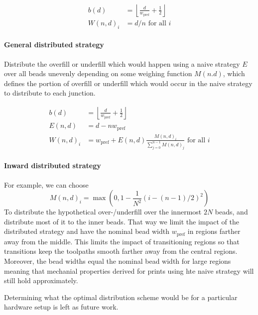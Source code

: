 \begin{align*}
b(d) &= \left\lfloor \frac{d}{ w_\text{pref}} + \frac12 \right\rfloor \\
W(n,d)_i &= d / n \text{ for all } i 
\end{align*}


\paragraph{General distributed strategy}
Distribute the overfill or underfill which would happen using a naive strategy $E$ over all beads unevenly depending on some weighing function $M(n.d)$, which defines the portion of overfill or underfill which would occur in the naive strategy to distribute to each junction.


\begin{align*}
b(d) &= \left\lfloor \frac{d}{ w_\text{pref}} + \frac12 \right\rfloor \\
E(n,d) &= d - n w_\text{pref} \\
W(n,d)_i &= w_\text{pref} + E(n,d) \frac{M(n,d)_i}{\sum_{j=0}^{n-1} M(n,d)_j} \text{ for all } i 
\end{align*}



\paragraph{Inward distributed strategy}
For example, we can choose 
$$M(n,d)_i = \max(0, 1 - \frac{1}{N^2} (i - (n-1)/2)^2 )$$
To distribute the hypothetical over-/underfill over the innermost $2N$ beads, and distribute most of it to the inner beads.
That way we limit the impact of the distributed strategy and have the nominal bead width $w_\text{pref}$ in regions farther away from the middle.
This limits the impact of transitioning regions so that transitions keep the toolpaths smooth farther away from the central regions.
Moreover, the bead widths equal the nominal bead width for large regions meaning that mechanial properties derived for prints using hte naive strategy will still hold approximately.

Determining what the optimal distribution scheme would be for a particular hardware setup is left as future work.



